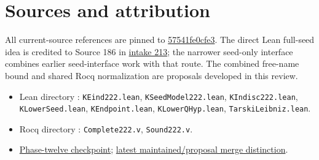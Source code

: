 \documentclass[10pt]{article}
\newcommand{\code}[1]{\texttt{#1}}
\begin{document}
\section*{Sources and attribution}
\small
All current-source references are pinned to \href{https://github.com/VladimirReshetnikov/ProveIt/commit/57541fe0cfe3af62b4cb58747d8d1d7c16b338d5}{57541fe0cfe3}. The direct Lean full-seed idea is credited to Source 186 in \href{https://github.com/VladimirReshetnikov/ProveIt/blob/57541fe0cfe3af62b4cb58747d8d1d7c16b338d5/SetTheory/Cardinals/docs/reports/set-theory/zfc-closure-kernels/intake-213.md}{intake 213}; the narrower seed-only interface combines earlier seed-interface work with that route. The combined free-name bound and shared Rocq normalization are proposals developed in this review.
\begin{itemize}
\item Lean directory : \code{KEind222.lean}, \code{KSeedModel222.lean}, \code{KIndisc222.lean}, \code{KLowerSeed.lean}, \code{KEndpoint.lean}, \code{KLowerQHyp.lean}, \code{TarskiLeibniz.lean}.
\item Rocq directory : \code{Complete222.v}, \code{Sound222.v}.
\item \href{https://github.com/VladimirReshetnikov/ProveIt/blob/57541fe0cfe3af62b4cb58747d8d1d7c16b338d5/Computability/BusyBeaver/Research/ZFC/k225-formal/verification/k215/simplification/phase12/README.md}{Phase-twelve checkpoint}; \href{https://github.com/VladimirReshetnikov/ProveIt/commit/57541fe0cfe3af62b4cb58747d8d1d7c16b338d5}{latest maintained/proposal merge distinction}.
\end{itemize}
\end{document}
